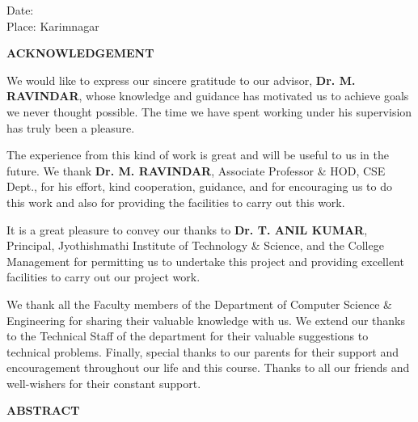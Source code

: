 \documentclass[12pt,a4paper,oneside]{report}
\numberwithin{figure}{chapter}
\numberwithin{table}{chapter}
\begin{document}
\vspace{1.5cm}
\noindent Date: \hrulefill\\[0.5cm]
\noindent Place: Karimnagar

\thispagestyle{empty}
\newpage
\begin{center}
  {\fontsize{16}{20}\selectfont\bfseries ACKNOWLEDGEMENT}
\end{center}
\vspace{2\baselineskip}
\onehalfspacing

{\fontsize{12}{16}\selectfont
\indent We would like to express our sincere gratitude to our advisor,
\textbf{Dr. M. RAVINDAR}, whose knowledge and guidance has motivated us to achieve
goals we never thought possible. The time we have spent working under his supervision
has truly been a pleasure.

\indent The experience from this kind of work is great and will be useful to us in the
future. We thank \textbf{Dr. M. RAVINDAR}, Associate Professor \& HOD, CSE Dept.,
for his effort, kind cooperation, guidance, and for encouraging us to do this work and
also for providing the facilities to carry out this work.

\indent It is a great pleasure to convey our thanks to \textbf{Dr. T. ANIL KUMAR},
Principal, Jyothishmathi Institute of Technology \& Science, and the College Management
for permitting us to undertake this project and providing excellent facilities to carry
out our project work.

\indent We thank all the Faculty members of the Department of Computer Science \&
Engineering for sharing their valuable knowledge with us. We extend our thanks to the
Technical Staff of the department for their valuable suggestions to technical problems.
Finally, special thanks to our parents for their support and encouragement throughout
our life and this course. Thanks to all our friends and well-wishers for their constant
support.
}

\newpage
\setcounter{page}{1}
\thispagestyle{plain}
\begin{center}
  {\fontsize{16}{20}\selectfont\bfseries ABSTRACT}
\end{center}
\vspace{2\baselineskip}
\end{document}
